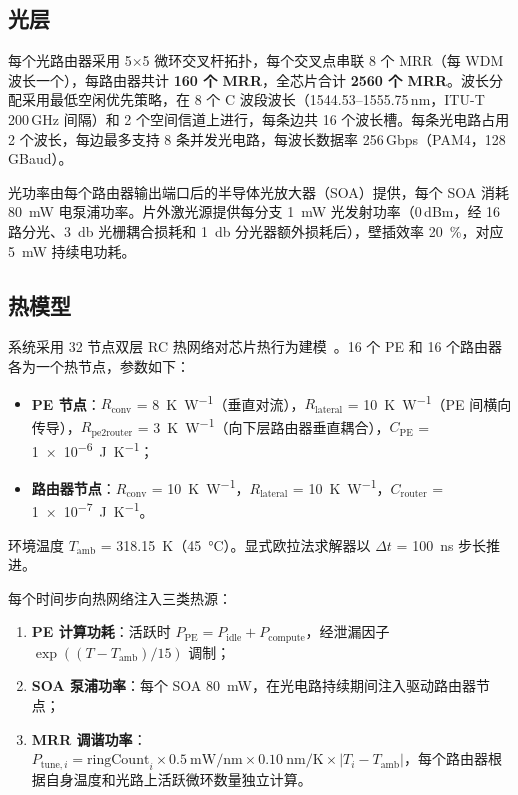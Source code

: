 \documentclass[conference]{IEEEtran}
\begin{document}
\subsection{光层}

每个光路由器采用 5$\times$5 微环交叉杆拓扑，每个交叉点串联 8 个 MRR（每 WDM 波长一个），每路由器共计 \textbf{160 个 MRR}，全芯片合计 \textbf{2560 个 MRR}。波长分配采用最低空闲优先策略，在 8 个 C 波段波长（1544.53--1555.75\,nm，ITU-T 200\,GHz 间隔）和 2 个空间信道上进行，每条边共 16 个波长槽。每条光电路占用 2 个波长，每边最多支持 8 条并发光电路，每波长数据率 256\,Gbps（PAM4，128\,GBaud）。

光功率由每个路由器输出端口后的半导体光放大器（SOA）提供，每个 SOA 消耗 \SI{80}{\milli\watt} 电泵浦功率。片外激光源提供每分支 \SI{1}{\milli\watt} 光发射功率（0\,dBm，经 16 路分光、\SI{3}{\decibel} 光栅耦合损耗和 \SI{1}{\decibel} 分光器额外损耗后），壁插效率 \SI{20}{\percent}，对应 \SI{5}{\milli\watt} 持续电功耗。

\subsection{热模型}

系统采用 32 节点双层 RC 热网络对芯片热行为建模~\cite{skadron2003}。16 个 PE 和 16 个路由器各为一个热节点，参数如下：
\begin{itemize}
\item \textbf{PE 节点}：$R_{\text{conv}}$ = \SI{8}{\kelvin\per\watt}（垂直对流），$R_{\text{lateral}}$ = \SI{10}{\kelvin\per\watt}（PE 间横向传导），$R_{\text{pe2router}}$ = \SI{3}{\kelvin\per\watt}（向下层路由器垂直耦合），$C_{\text{PE}}$ = \SI{1e-6}{\joule\per\kelvin}；
\item \textbf{路由器节点}：$R_{\text{conv}}$ = \SI{10}{\kelvin\per\watt}，$R_{\text{lateral}}$ = \SI{10}{\kelvin\per\watt}，$C_{\text{router}}$ = \SI{1e-7}{\joule\per\kelvin}。
\end{itemize}
环境温度 $T_{\text{amb}}$ = \SI{318.15}{\kelvin}（\SI{45}{\degreeCelsius}）。显式欧拉法求解器以 $\Delta t$ = \SI{100}{\nano\second} 步长推进。

每个时间步向热网络注入三类热源：
\begin{enumerate}
\item \textbf{PE 计算功耗}：活跃时 $P_{\text{PE}} = P_{\text{idle}} + P_{\text{compute}}$，经泄漏因子 $\exp((T - T_{\text{amb}})/15)$ 调制；
\item \textbf{SOA 泵浦功率}：每个 SOA \SI{80}{\milli\watt}，在光电路持续期间注入驱动路由器节点；
\item \textbf{MRR 调谐功率}：$P_{\text{tune},i} = \text{ringCount}_i \times \SI{0.5}{\milli\watt\per\nano\meter} \times \SI{0.10}{\nano\meter\per\kelvin} \times |T_i - T_{\text{amb}}|$，每个路由器根据自身温度和光路上活跃微环数量独立计算。
\end{enumerate}
\end{document}
